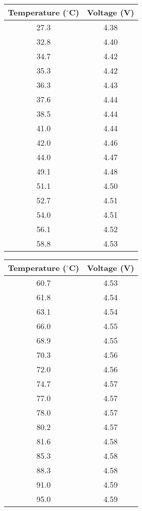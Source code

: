 \begin{table}[h!]
\centering
\begin{tabular}{|c|c|}
    \hline
    \textbf{Temperature ($^\circ$C)} & \textbf{Voltage (V)} \\
    \hline
    27.3 & 4.38 \\
    32.8 & 4.40 \\
    34.7 & 4.42 \\
    35.3 & 4.42 \\
    36.3 & 4.43 \\
    37.6 & 4.44 \\
    38.5 & 4.44 \\
    41.0 & 4.44 \\
    42.0 & 4.46 \\
    44.0 & 4.47 \\
    49.1 & 4.48 \\
    51.1 & 4.50 \\
    52.7 & 4.51 \\
    54.0 & 4.51 \\
    56.1 & 4.52 \\
    58.8 & 4.53 \\
    \hline
\end{tabular}
    \quad
\begin{tabular}{|c|c|}
    \hline
    \textbf{Temperature ($^\circ$C)} & \textbf{Voltage (V)} \\
    \hline
    60.7 & 4.53 \\
    61.8 & 4.54 \\
    63.1 & 4.54 \\
    66.0 & 4.55 \\
    68.9 & 4.55 \\
    70.3 & 4.56 \\
    72.0 & 4.56 \\
    74.7 & 4.57 \\
    77.0 & 4.57 \\
    78.0 & 4.57 \\
    80.2 & 4.57 \\
    81.6 & 4.58 \\
    85.3 & 4.58 \\
    88.3 & 4.58 \\
    91.0 & 4.59 \\
    95.0 & 4.59 \\
    \hline
\end{tabular}
\end{table}